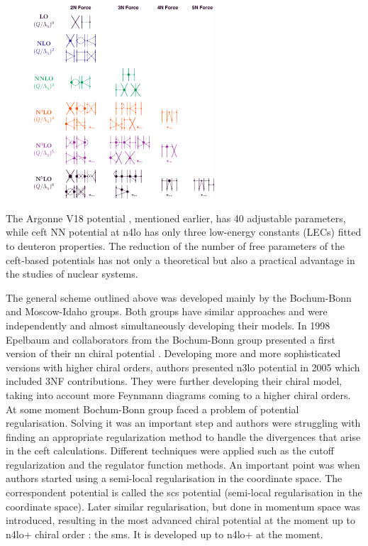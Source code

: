 \begin{figure}[h]
    \begin{center}
    \includegraphics[width=0.6\textwidth]{Figures/chiral.png}
    \end{center}
    \caption{}
    \label{chiral_diagrams}
\end{figure}

The Argonne V18 potential \cite{AV18Wiringa}, mentioned earlier, has 40 adjustable parameters,
while \gls{ceft} NN potential at \gls{n4lo} \cite{Machleidt2011} has only three low-energy constants (LECs) fitted to deuteron properties.
The reduction of the number of free parameters of the \gls{ceft}-based potentials
has not only a theoretical but also a practical advantage in the studies of nuclear systems.

The general scheme outlined above was developed mainly by the Bochum-Bonn and Moscow-Idaho groups.
Both groups have similar approaches and were independently and almost simultaneously
developing their models. In 1998 Epelbaum and collaborators from the Bochum-Bonn group 
presented a first version of their \gls{nn} chiral potential \cite{EPELBAOUM1998107, epelbaum2000two}.
Developing more and more sophisticated versions with higher chiral orders, authors presented
\gls{n3lo} potential in 2005 \cite{epelbaum2005two} which included 3NF contributions.
They were further developing their chiral model, taking into account more Feynmann diagrams
coming to a higher chiral orders.
At some moment Bochum-Bonn group faced a problem of potential regularisation\cite{skibinski_3H, Witala_2014}.
Solving it was an important step and authors
were struggling with finding an appropriate
regularization method to handle the divergences that arise in the \gls{ceft} calculations.
Different techniques were applied such as the cutoff regularization and the regulator function methods.
An important point was when authors started using a semi-local regularisation 
in the coordinate space. The correspondent potential is called the \gls{scs} potential
(semi-local regularisation in the coordinate space)\cite{Epelbaum2014SCS}.
Later similar regularisation,
but done in momentum space was introduced, resulting in the most advanced chiral potential at the moment up to  
\gls{n4lo+} chiral order \cite{reinkrebs2018}: the \gls{sms}. It is developed up to \gls{n4lo+} at the moment.

